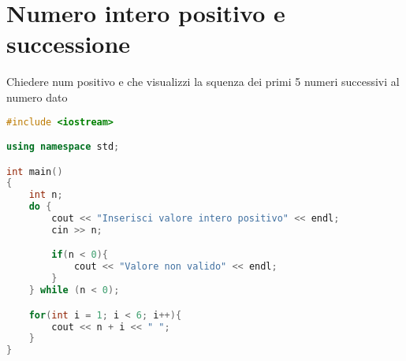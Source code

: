 \documentclass{article}
\begin{document}
\pagebreak
\section{Numero intero positivo e successione} Chiedere num positivo e che visualizzi la squenza dei primi 5 numeri successivi al numero dato

\begin{lstlisting}[language=C++]
#include <iostream>

using namespace std;

int main()
{
    int n;
    do {
        cout << "Inserisci valore intero positivo" << endl;
        cin >> n;

        if(n < 0){
            cout << "Valore non valido" << endl;
        }
    } while (n < 0);

    for(int i = 1; i < 6; i++){
        cout << n + i << " "; 
    }
}
\end{lstlisting}
\vspace*{\fill}
\clearpage
\end{document}
